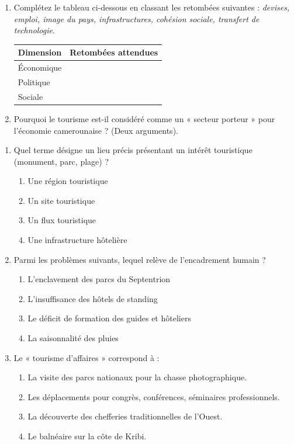 \documentclass[11pt]{article}
\begin{document}
\begin{exercice}
\begin{enumerate}
    \item Complétez le tableau ci-dessous en classant les retombées suivantes : \textit{devises, emploi, image du pays, infrastructures, cohésion sociale, transfert de technologie}.
    \begin{tabular}{|l|p{8cm}|}
    \hline
    \textbf{Dimension} & \textbf{Retombées attendues} \\ \hline
    Économique & \\ \hline
    Politique & \\ \hline
    Sociale & \\ \hline
    \end{tabular}
    \item Pourquoi le tourisme est-il considéré comme un « secteur porteur » pour l'économie camerounaise ? (Deux arguments).
\end{enumerate}
\end{exercice}

\begin{exercice}
\begin{enumerate}
    \item Quel terme désigne un lieu précis présentant un intérêt touristique (monument, parc, plage) ?
    \begin{enumerate}
        \item Une région touristique
        \item Un site touristique
        \item Un flux touristique
        \item Une infrastructure hôtelière
    \end{enumerate}
    \item Parmi les problèmes suivants, lequel relève de l'encadrement humain ?
    \begin{enumerate}
        \item L'enclavement des parcs du Septentrion
        \item L'insuffisance des hôtels de standing
        \item Le déficit de formation des guides et hôteliers
        \item La saisonnalité des pluies
    \end{enumerate}
    \item Le « tourisme d'affaires » correspond à :
    \begin{enumerate}
        \item La visite des parcs nationaux pour la chasse photographique.
        \item Les déplacements pour congrès, conférences, séminaires professionnels.
        \item La découverte des chefferies traditionnelles de l'Ouest.
        \item Le balnéaire sur la côte de Kribi.
    \end{enumerate}
\end{enumerate}
\end{exercice}
\end{document}
